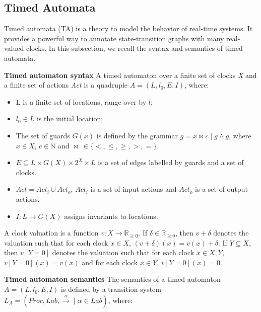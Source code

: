 \subsection{Timed Automata}
Timed automata (TA) \cite{BehrmannDLHPYH06} is a theory to model the behavior of real-time systems. It provides a powerful way to annotate state-transition graphs with many real-valued clocks. In this subsection, we recall the syntax and semantics of timed automata. 
\begin{definition}
\textbf{Timed automaton syntax}
A timed automaton over a finite set of clocks \emph{X} and a finite set of actions \emph{Act} is a quadruple $\textit{A}=(L,l_{0},E,I)$, where:
\end{definition}
\begin{itemize}
\item
L is a finite set of locations, range over by $l$;
\item
$l_{0} \in  L$ is the initial location;
\item
The set of guards $G(x)$ is defined by the grammar $g = x \bowtie c \mid g \land g$, where $x \in X$, $c \in \mathbb{N}$ and $\bowtie~\in \{<,\leqslant,\geqslant,>,=\}$. 
\item
$E \subseteq L \times G(X) \times 2^X \times L$ is a set of edges labelled by guards and a set of clocks.
\item
$Act = Act_{i} \cup Act_{o}$, $Act_{i}$ is a set of input actions and $Act_{o}$ is a set of output actions.
\item
$I : L \rightarrow G(X)$ assigns invariants to locations.
\end{itemize}
A clock valuation is a function $v : X \rightarrow \mathbb{R}_{\geqslant{0}}$. If $\delta \in \mathbb{R}_{\geqslant{0}}$, then $v + \delta$ denotes the valuation such that for each clock $x \in X$, $(v + \delta)(x) = v(x) + \delta$. If $Y \subseteq X$, then $v[Y = 0]$ denotes the valuation such that for each clock $x \in X, Y$, $v[Y = 0](x) = v(x)$ and for each clock $x \in Y$, $v[Y = 0](x) = 0$.
\begin{definition}
\textbf{Timed automaton semantics} 
The semantics of a timed automaton $\textit{A}=(L,l_{0},E,I)$ is defined by a transition system $L_{\textit{A}} = (Proc,Lab,{{\xrightarrow{\alpha}}} \mid \alpha \in Lab)$, where:
\end{definition}
